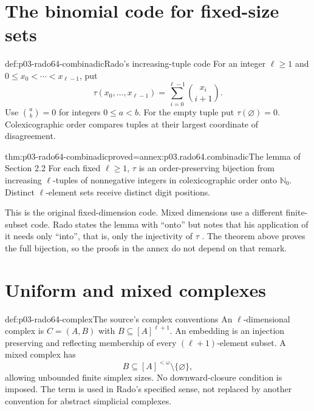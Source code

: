 \section{The binomial code for fixed-size sets}
\label{sec:p03-rado64-binomial}

\begin{hbdefinition}{def:p03-rado64-combinadic}{Rado's increasing-tuple code}
For an integer \(\ell\geq1\) and \(0\leq x_0<\cdots<x_{\ell-1}\), put
\[
 \tau(x_0,\ldots,x_{\ell-1})
       =\sum_{i=0}^{\ell-1}\binom{x_i}{i+1}.
\]
Use \(\binom ab=0\) for integers \(0\leq a<b\).
For the empty tuple put \(\tau(\varnothing)=0\).
Colexicographic order compares tuples at their largest coordinate of
disagreement.
\end{hbdefinition}

\begin{hbtheorem}{thm:p03-rado64-combinadic}{proved=annex:p03.rado64.combinadic}{The lemma of Section 2.2}
For each fixed \(\ell\geq1\), \(\tau\) is an order-preserving bijection from
increasing \(\ell\)-tuples of nonnegative integers in colexicographic order
onto \(\mathbb N_0\). Distinct \(\ell\)-element sets receive distinct digit
positions.
\end{hbtheorem}

This is the original fixed-dimension code. Mixed dimensions use a different
finite-subset code.
Rado states the lemma with ``onto'' but notes that his application of it
needs only ``into'', that is, only the injectivity of \(\tau\)
\cite[\S2.2 and n.~4, p.~333]{Rado1964}. The theorem above proves the
full bijection, so the proofs in the annex do not depend on that remark.

\section{Uniform and mixed complexes}
\label{sec:p03-rado64-complexes}

\begin{hbdefinition}{def:p03-rado64-complex}{The source's complex conventions}
An \(\ell\)-dimensional complex is \(C=(A,B)\) with
\(B\subseteq[A]^{\ell+1}\). An embedding is an injection preserving and reflecting
membership of every \((\ell+1)\)-element subset.
A mixed complex has
\[
 B\subseteq[A]^{<\omega}\setminus\{\varnothing\},
\]
allowing unbounded finite simplex sizes. No downward-closure condition is
imposed. The term is used in Rado's specified sense, not replaced by another
convention for abstract simplicial complexes.
\end{hbdefinition}

